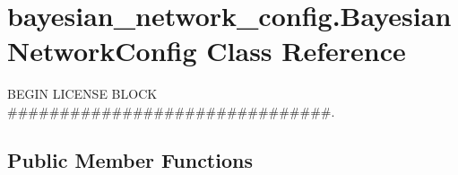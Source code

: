 \hypertarget{classbayesian__network__config_1_1_bayesian_network_config}{}\section{bayesian\+\_\+network\+\_\+config.\+Bayesian\+Network\+Config Class Reference}
\label{classbayesian__network__config_1_1_bayesian_network_config}


B\+E\+G\+IN L\+I\+C\+E\+N\+SE B\+L\+O\+CK \#\#\#\#\#\#\#\#\#\#\#\#\#\#\#\#\#\#\#\#\#\#\#\#\#\#\#\#\#\#\#.  


\subsection*{Public Member Functions}
